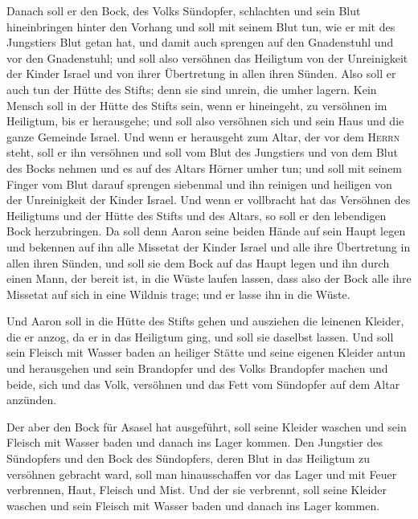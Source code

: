  Danach soll er den Bock, des Volks Sündopfer, schlachten
und sein Blut hineinbringen hinter den Vorhang und soll mit seinem Blut
tun, wie er mit des Jungstiers Blut getan hat, und damit auch sprengen
auf den Gnadenstuhl und vor den Gnadenstuhl;  und soll
also versöhnen das Heiligtum von der Unreinigkeit der Kinder Israel und
von ihrer Übertretung in allen ihren Sünden. Also soll er auch tun der
Hütte des Stifts; denn sie sind unrein, die umher lagern.
 Kein Mensch soll in der Hütte des Stifts sein, wenn er
hineingeht, zu versöhnen im Heiligtum, bis er herausgehe; und soll also
versöhnen sich und sein Haus und die ganze Gemeinde Israel.
 Und wenn er herausgeht zum Altar, der vor dem
\textsc{Herrn} steht, soll er ihn versöhnen und soll vom Blut des
Jungstiers und von dem Blut des Bocks nehmen und es auf des Altars
Hörner umher tun;  und soll mit seinem Finger vom Blut
darauf sprengen siebenmal und ihn reinigen und heiligen von der
Unreinigkeit der Kinder Israel.  Und wenn er vollbracht
hat das Versöhnen des Heiligtums und der Hütte des Stifts und des
Altars, so soll er den lebendigen Bock herzubringen.  Da
soll denn Aaron seine beiden Hände auf sein Haupt legen und bekennen auf
ihn alle Missetat der Kinder Israel und alle ihre Übertretung in allen
ihren Sünden, und soll sie dem Bock auf das Haupt legen und ihn durch
einen Mann, der bereit ist, in die Wüste laufen lassen, 
dass also der Bock alle ihre Missetat auf sich in eine Wildnis trage;
und er lasse ihn in die Wüste.

 Und Aaron soll in die Hütte des Stifts gehen und
ausziehen die leinenen Kleider, die er anzog, da er in das Heiligtum
ging, und soll sie daselbst lassen.  Und soll sein
Fleisch mit Wasser baden an heiliger Stätte und seine eigenen Kleider
antun und herausgehen und sein Brandopfer und des Volks Brandopfer
machen und beide, sich und das Volk, versöhnen  und das
Fett vom Sündopfer auf dem Altar anzünden.

 Der aber den Bock für Asasel hat ausgeführt, soll seine
Kleider waschen und sein Fleisch mit Wasser baden und danach ins Lager
kommen.  Den Jungstier des Sündopfers und den Bock des
Sündopfers, deren Blut in das Heiligtum zu versöhnen gebracht ward, soll
man hinausschaffen vor das Lager und mit Feuer verbrennen, Haut, Fleisch
und Mist.  Und der sie verbrennt, soll seine Kleider
waschen und sein Fleisch mit Wasser baden und danach ins Lager kommen.

